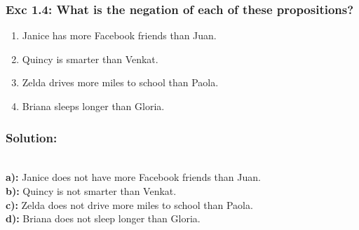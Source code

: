 \subsubsection*{Exc 1.4: What is the negation of each of these propositions?}
\begin{enumerate}[label=(\alph*)]
\item Janice has more Facebook friends than Juan.
\item Quincy is smarter than Venkat.
\item Zelda drives more miles to school than Paola.
\item Briana sleeps longer than Gloria.
\end{enumerate}
\subsubsection*{Solution:}
\\
\textbf{a):} Janice does not have more Facebook friends than Juan.
\\
\textbf{b):} Quincy is not smarter than Venkat.
\\
\textbf{c):} Zelda does not drive more miles to school than Paola.
\\
\textbf{d):} Briana does not sleep longer than Gloria.
